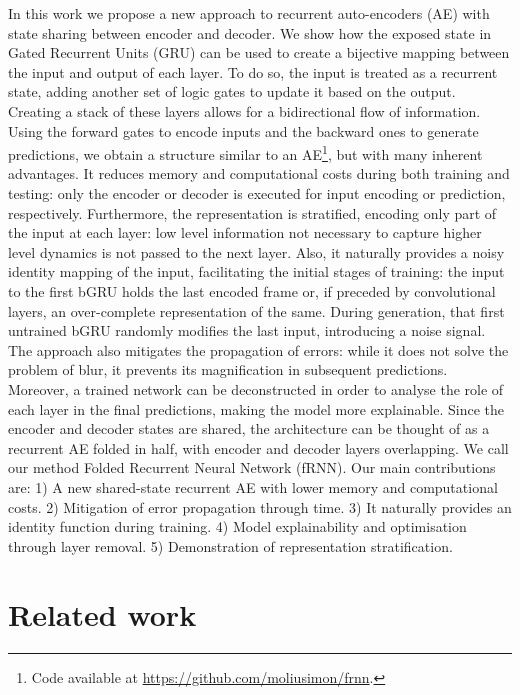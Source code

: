 \documentclass[runningheads]{llncs}
\begin{document}
In this work we propose a new approach to recurrent auto-encoders (AE) with state sharing between encoder and decoder. We show how the exposed state in Gated Recurrent Units (GRU) can be used to create a bijective mapping between the input and output of each layer. To do so, the input is treated as a recurrent state, adding another set of logic gates to update it based on the output. Creating a stack of these layers allows for a bidirectional flow of information. Using the forward gates to encode inputs and the backward ones to generate predictions, we obtain a structure similar to an AE\footnote{Code available at \url{https://github.com/moliusimon/frnn}.}, but with many inherent advantages. It reduces memory and computational costs during both training and testing: only the encoder or decoder is executed for input encoding or prediction, respectively. Furthermore, the representation is stratified, encoding only part of the input at each layer: low level information not necessary to capture higher level dynamics is not passed to the next layer. Also, it naturally provides a noisy identity mapping of the input, facilitating the initial stages of training: the input to the first bGRU holds the last encoded frame or, if preceded by convolutional layers, an over-complete representation of the same. During generation, that first untrained bGRU randomly modifies the last input, introducing a noise signal. The approach also mitigates the propagation of errors: while it does not solve the problem of blur, it prevents its magnification in subsequent predictions. Moreover, a trained network can be deconstructed in order to analyse the role of each layer in the final predictions, making the model more explainable. Since the encoder and decoder states are shared, the architecture can be thought of as a recurrent AE folded in half, with encoder and decoder layers overlapping. We call our method Folded Recurrent Neural Network (fRNN). Our main contributions are: 1) A new shared-state recurrent AE with lower memory and computational costs. 2) Mitigation of error propagation through time. 3) It naturally provides an identity function during training. 4) Model explainability and optimisation through layer removal. 5) Demonstration of representation stratification.





\section{Related work}
\label{sec:sota}
\end{document}
